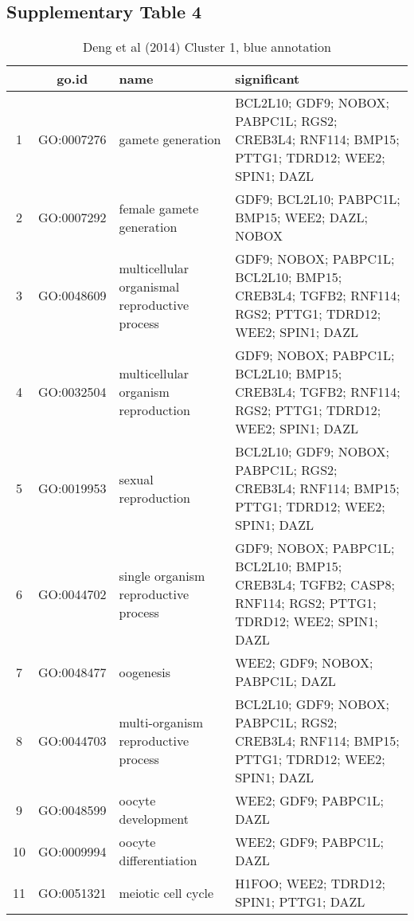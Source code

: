 \clearpage






\subsection{Supplementary Table 4}



\begin{table}[htp]
\begin{center}
\caption{Deng et al (2014) Cluster 1, blue annotation} \label{tab:tab9}
\begin{tabular}{|c|c|p{1.5in}|p{4in}|}
  \hline
 & go.id & name & significant \\ 
  \hline
1 & GO:0007276 & gamete generation & \footnotesize{BCL2L10; GDF9; NOBOX; PABPC1L; RGS2; CREB3L4; RNF114; BMP15; PTTG1; TDRD12; WEE2; SPIN1; DAZL} \\ 
  2 & GO:0007292 & female gamete generation & \footnotesize{GDF9; BCL2L10; PABPC1L; BMP15; WEE2; DAZL; NOBOX} \\ 
  3 & GO:0048609 & multicellular organismal reproductive process & \footnotesize{GDF9; NOBOX; PABPC1L; BCL2L10; BMP15; CREB3L4; TGFB2; RNF114; RGS2; PTTG1; TDRD12; WEE2; SPIN1; DAZL} \\ 
  4 & GO:0032504 & multicellular organism reproduction & \footnotesize{GDF9; NOBOX; PABPC1L; BCL2L10; BMP15; CREB3L4; TGFB2; RNF114; RGS2; PTTG1; TDRD12; WEE2; SPIN1; DAZL}\\ 
  5 & GO:0019953 & sexual reproduction & \footnotesize{BCL2L10; GDF9; NOBOX; PABPC1L; RGS2; CREB3L4; RNF114; BMP15; PTTG1; TDRD12; WEE2; SPIN1; DAZL} \\ 
  6 & GO:0044702 & single organism reproductive process & \footnotesize{GDF9; NOBOX; PABPC1L; BCL2L10; BMP15; CREB3L4; TGFB2; CASP8; RNF114; RGS2; PTTG1; TDRD12; WEE2; SPIN1; DAZL} \\ 
  7 & GO:0048477 & oogenesis & \footnotesize{WEE2; GDF9; NOBOX; PABPC1L; DAZL} \\ 
  8 & GO:0044703 & multi-organism reproductive process & \footnotesize{BCL2L10; GDF9; NOBOX; PABPC1L; RGS2; CREB3L4; RNF114; BMP15; PTTG1; TDRD12; WEE2; SPIN1; DAZL} \\ 
  9 & GO:0048599 & oocyte development  & \footnotesize{WEE2; GDF9; PABPC1L; DAZL} \\ 
  10 & GO:0009994 & oocyte differentiation & \footnotesize{WEE2; GDF9; PABPC1L; DAZL} \\ 
  11 & GO:0051321 & meiotic cell cycle & \footnotesize{H1FOO; WEE2; TDRD12; SPIN1; PTTG1; DAZL} \\ 

\end{tabular}
\end{center}
\end{table}
